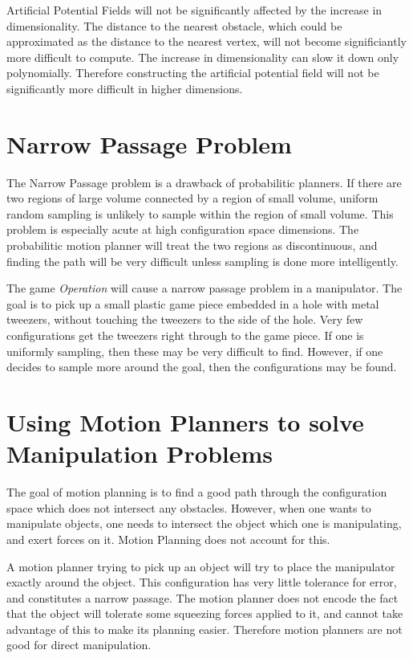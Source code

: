 \documentclass{article}
\begin{document}
Artificial Potential Fields will not be significantly affected by the increase
	in dimensionality.
The distance to the nearest obstacle, which could be approximated as the distance to the
	nearest vertex, will not become significiantly more difficult to compute.
The increase in dimensionality can slow it down only polynomially.
Therefore constructing the artificial potential field will not be significantly more
	difficult in higher dimensions.

\section{Narrow Passage Problem}

The Narrow Passage problem is a drawback of probabilitic planners.
If there are two regions of large volume connected by a region of small volume,
	uniform random sampling is unlikely to sample within the region of small volume.
This problem is especially acute at high configuration space dimensions.
The probabilitic motion planner will treat the two regions as discontinuous, and finding
	the path will be very difficult unless sampling is done more intelligently.

The game \emph{Operation} will cause a narrow passage problem in a manipulator.
The goal is to pick up a small plastic game piece embedded in a hole with metal tweezers, 
	without touching the tweezers to the side of the hole.
Very few configurations get the tweezers right through to the game piece.
If one is uniformly sampling, then these may be very difficult to find.
However, if one decides to sample more around the goal, then the configurations may be
	found.

\section{Using Motion Planners to solve Manipulation Problems}

The goal of motion planning is to find a good path through the configuration space which
	does not intersect any obstacles.
However, when one wants to manipulate objects, one needs to intersect the object which
	one is manipulating, and exert forces on it.
Motion Planning does not account for this.

A motion planner trying to pick up an object will try to place the manipulator exactly around
	the object.
This configuration has very little tolerance for error, and constitutes a narrow passage.
The motion planner does not encode the fact that the object will tolerate some squeezing 
	forces applied to it, and cannot take advantage of this to make its planning easier.
Therefore motion planners are not good for direct manipulation.
\end{document}
